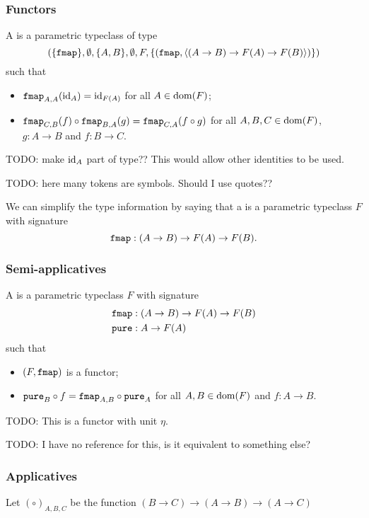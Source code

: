 \subsubsection{Functors}
\begin{definition}
A  is a parametric typeclass of type
\[ \sSet{\{\fmap\}, \emptyset, \{A, B\}, \emptyset, F, \{ (\fmap, \seq{(A\to B) \to F(A) \to F(B)}) \} } \]
such that
\begin{itemize}
\item $\mathtt{fmap}_{A,A}(\operatorname{id}_A) = \operatorname{id}_{F(A)}$ for all $A\in \operatorname{dom}(F)$;
\item $\mathtt{fmap}_{C,B}(f)\circ \mathtt{fmap}_{B,A}(g) = \mathtt{fmap}_{C,A}(f\circ g)$ for all $A,B,C\in \operatorname{dom}(F)$, $g: A\to B$ and $f: B\to C$.
\end{itemize}
\end{definition}
TODO: make $\operatorname{id}_A$ part of type?? This would allow other identities to be used.

TODO: here many tokens are symbols. Should I use quotes??

We can simplify the type information by saying that a  is a parametric typeclass $F$ with signature
\[ \mathtt{fmap}: (A\to B) \to F(A) \to F(B). \]


\subsubsection{Semi-applicatives}
\begin{definition}
A  is a parametric typeclass $F$ with signature
\begin{align*}
&\mathtt{fmap}: (A\to B) \to F(A) \to F(B) \\
&\mathtt{pure}: A\to F(A)
\end{align*}
such that
\begin{itemize}
\item $\sSet{F,\fmap}$ is a functor;
\item $\mathtt{pure}_B\circ f = \mathtt{fmap}_{A,B} \circ \mathtt{pure}_A$ for all $A,B\in \operatorname{dom}(F)$ and $f: A\to B$.
\end{itemize}
\end{definition}
TODO: This is a functor with unit $\eta$.

TODO: I have no reference for this, is it equivalent to something else?


\subsubsection{Applicatives}
Let $(\circ)_{A,B,C}$ be the function $(B\to C) \to (A\to B) \to (A\to C)$


